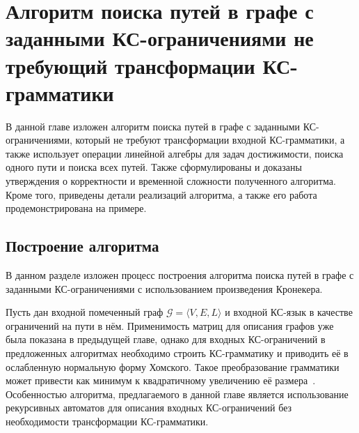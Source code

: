 \chapter{Алгоритм поиска путей в графе с заданными КС-ограничениями не требующий трансформации КС-грамматики}\label{ch:ch4}
В данной главе изложен алгоритм поиска путей в графе с заданными КС-ограничениями, который не требуют трансформации входной КС-грамматики, а также использует операции линейной алгебры для задач достижимости, поиска одного пути и поиска всех путей. Также сформулированы и доказаны утверждения о корректности и временной сложности полученного алгоритма. Кроме того, приведены детали реализаций алгоритма, а также его работа продемонстрирована на примере.

\section{Построение алгоритма}\label{sec:ch4/sect1}
В данном разделе изложен процесс построения алгоритма поиска путей в графе с заданными КС-ограничениями с использованием произведения Кронекера.

Пусть дан входной помеченный граф $\mathcal{G} = \langle V, E, L\rangle$ и входной КС-язык в качестве ограничений на пути в нём. Применимость матриц для описания графов уже была показана в предыдущей главе, однако для входных КС-ограничений в предложенных алгоритмах необходимо строить КС-грамматику и приводить её в ослабленную нормальную форму Хомского. Такое преобразование грамматики может привести как минимум к квадратичному увеличению её размера~\cite{hopcroft2001introduction}. Особенностью алгоритма, предлагаемого в данной главе является использование рекурсивных автоматов для описания входных КС-ограничений без необходимости трансформации КС-грамматики.

